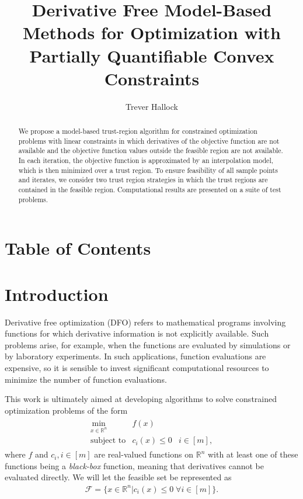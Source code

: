 \documentclass{article}
\title{Derivative Free Model-Based Methods for Optimization with Partially Quantifiable Convex Constraints}
\author{Trever Hallock}
\theoremstyle{case}
\numberwithin{theorem}{subsection}
\newcommand{\feasible}{{\mathcal F}}
\newcommand{\Rn}{\mathbb R^n}
\begin{document}
\maketitle

\begin{abstract}

We propose a model-based trust-region algorithm for constrained optimization problems with linear constraints in which derivatives of the objective function are not available and the objective function values outside the feasible region are not available.
In each iteration, the objective function is approximated by an interpolation model, which is then minimized over a trust region.
To ensure feasibility of all sample points and iterates, we consider two trust region strategies in which the trust regions are contained in the feasible region.
Computational results are presented on a suite of test problems.

\end{abstract}

\newpage

\section{Table of Contents}

\tableofcontents

\newpage


\section{Introduction}

Derivative free optimization (DFO) refers to mathematical programs involving functions for which derivative information is not explicitly available.
Such problems arise, for example, when the functions are evaluated by simulations or by laboratory experiments.
In such applications, function evaluations are expensive, so it is sensible to invest significant computational resources to minimize the number of function evaluations.

This work is ultimately aimed at developing algorithms to solve constrained optimization problems of the form 
\begin{align*}
\begin{array}{ccl} \min_{x \in \Rn} & f(x) \\
\mbox{subject to} & c_i(x) \le 0 & i \in [m],
\end{array}
\end{align*}
where 
$f$ and $c_i, i \in [m]$ are real-valued functions on $\Rn$ with at least one of these functions being a {\em black-box} function, meaning that derivatives cannot be evaluated directly.
We will let the feasible set be represented as 
\begin{align}
\feasible = \{x \in \Rn | c_i(x) \le 0 \; \forall i \in [m] \}. \label{define_feasible}
\end{align}
\end{document}
